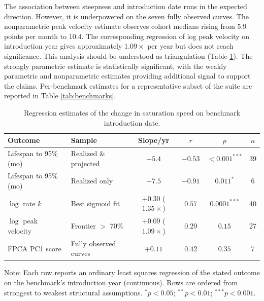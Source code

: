 The association between steepness and introduction date runs in the expected direction. However, it is underpowered on the seven fully observed curves. The nonparametric peak velocity estimate observes cohort medians rising from 5.9 points per month to 10.4. The corresponding regression of log peak velocity on introduction year gives approximately $1.09\times$ per year but does not reach significance. This analysis should be understood as triangulation (Table \ref{tab:regressions}). The strongly parametric estimate is statistically significant, with the weakly parametric and nonparametric estimates providing additional signal to support the claims. Per-benchmark estimates for a representative subset of the suite are reported in Table \ref{tab:benchmarks}.

\begin{table}[t]
\centering
\begin{threeparttable}
\caption{Regression estimates of the change in saturation speed on benchmark introduction date.}
\label{tab:regressions}
{\setlength{\tabcolsep}{3pt}\footnotesize
\begin{tabular}{llcccc}
\toprule
Outcome & Sample & Slope/yr & $r$ & $p$ & $n$ \\
\midrule
Lifespan to 95\% (mo)  & Realized \& projected & $-5.4$ & $-0.53$ & $<0.001^{***}$ & 39 \\
Lifespan to 95\% (mo)  & Realized only         & $-7.5$ & $-0.91$ & $0.011^{*}$    & 6  \\
$\log$ rate $k$        & Best sigmoid fit      & $+0.30$ ($1.35\times$) & $0.57$ & $0.0001^{***}$ & 40 \\
$\log$ peak velocity   & Frontier $>$ 70\%     & $+0.09$ ($1.09\times$) & $0.29$ & $0.15$ & 27 \\
FPCA PC1 score         & Fully observed curves & $+0.11$ & $0.42$ & $0.35$ & 7 \\
\bottomrule
\end{tabular}%
}
\begin{tablenotes}
\footnotesize
\item Note: Each row reports an ordinary least squares regression of the stated outcome on the benchmark's introduction year (continuous). Rows are ordered from strongest to weakest structural assumptions. $^{*}p<0.05$; $^{**}p<0.01$; $^{***}p<0.001$.
\end{tablenotes}
\end{threeparttable}
\end{table}

